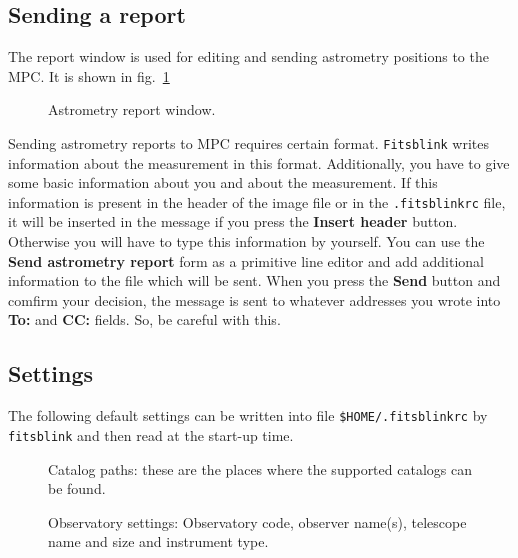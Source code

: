 \documentclass[11pt]{article}
\begin{document}
\subsection{Sending a report}
\label{report}

The report window is used for editing and sending astrometry positions
to the MPC.  It is shown in fig.~\ref{astrometry_report}

\begin{figure}
\begin{center}
\epsfxsize=8cm
\caption{Astrometry report window.}
\label{astrometry_report}
\end{center}
\end{figure}

Sending astrometry reports to MPC requires certain
format. \verb=Fitsblink= writes information about the measurement in
this format.  Additionally, you have to give some basic information
about you and about the measurement.  If this information is present
in the header of the image file or in the \verb=.fitsblinkrc= file, it
will be inserted in the message if you press the \textbf{Insert
header} button.  Otherwise you will have to type this information by
yourself.  You can use the \textbf{Send astrometry report} form as a
primitive line editor and add additional information to the file which
will be sent.  When you press the \textbf{Send} button and comfirm
your decision, the message is sent to whatever addresses you wrote
into \textbf{To:} and \textbf{CC:} fields.  So, be careful with this.

\subsection{Settings}

The following default settings can be written into file
\verb=$HOME/.fitsblinkrc= by \verb=fitsblink= and then read at the
start-up time.  

\begin{figure}
\begin{center}
\epsfxsize=8cm
\caption{Catalog paths: these are the places where the supported catalogs
can be found.}
\label{catalog_paths}
\end{center}
\end{figure}

\begin{figure}
\begin{center}
\epsfxsize=8cm
\caption{Observatory settings: Observatory code, observer name(s),
telescope name and size and instrument type.}
\label{observatory}
\end{center}
\end{figure}
\end{document}
